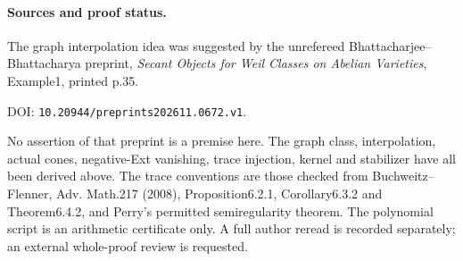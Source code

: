 \paragraph{Sources and proof status.}
The graph interpolation idea was suggested by the unrefereed
Bhattacharjee--Bhattacharya preprint,
\emph{Secant Objects for Weil Classes on Abelian Varieties},
Example1, printed p.35.
\par DOI: \texttt{10.20944/preprints202611.0672.v1}.
\par
No assertion of that preprint is a premise here. The graph class,
interpolation, actual cones, negative-Ext vanishing, trace injection,
kernel and stabilizer have all been derived above.
The trace conventions are those checked from
Buchweitz--Flenner, Adv. Math.217 (2008), Proposition6.2.1,
Corollary6.3.2 and Theorem6.4.2, and Perry's permitted
semiregularity theorem. The polynomial script is an arithmetic
certificate only. A full author reread is recorded separately;
an external whole-proof review is requested.
